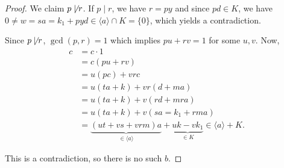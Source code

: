 \begin{proof}
	We claim $p\not\mid r$. If $p\mid r$, we have $r=py$ and since $pd\in K$, we have $0\neq w=sa=k_1+pyd\in\langle a\rangle \cap K=\{0\}$, which yields a contradiction.

	Since $p\not\mid r$, $\gcd(p,r)=1$ which implies $pu+rv=1$ for some $u,v$. Now,
	\begin{align*}
		c&=c\cdot 1\\
		&=c(pu+rv)\\
		&=u(pc)+vrc\\
		&=u(ta+k)+vr(d+ma)\\
		&=u(ta+k)+v(rd+mra)\\
		&=u(ta+k)+v(sa=k_1+rma)\\
		&=\underbrace{(ut+vs+vrm)a}_{\in \langle a\rangle}+\underbrace{uk-vk_1}_{\in K}\in \langle a\rangle+K.
	\end{align*}

	This is a contradiction, so there is no such $b$.
\end{proof}